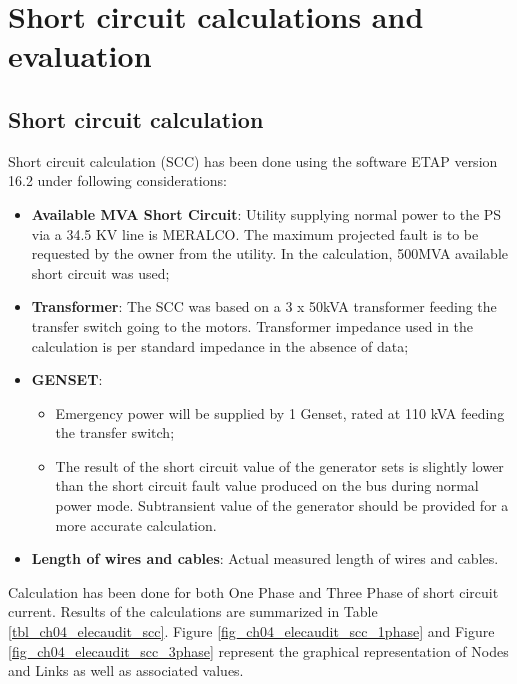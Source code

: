 %
\section{Short circuit calculations and evaluation} \label{ch04_elecaudit_shortcuircuitanalysis}
\subsection{Short circuit calculation}
Short circuit calculation (SCC) has been done using the software ETAP version 16.2 under following considerations:
\begin{itemize}
\item \textbf{Available MVA Short Circuit}: Utility supplying normal power to the PS  via a 34.5 KV line is MERALCO. The maximum projected fault is to be requested by the owner from the utility.  In the calculation, 500MVA available short circuit was used;

\item \textbf{Transformer}: The SCC was based on a  3 x 50kVA transformer  feeding the transfer switch going to the motors. Transformer impedance used in the calculation is per standard impedance in the absence of data;

\item \textbf{GENSET}: 
\begin{itemize}
\item Emergency power will be supplied by 1 Genset, rated at 110 kVA feeding the transfer switch;%

\item The result of the short circuit value of the generator sets is slightly lower than the short circuit fault value produced on the bus during normal power mode. Subtransient value of the generator should be provided for a more accurate calculation. 

\end{itemize}

\item \textbf{Length of wires and cables}: Actual measured length of wires and cables.

\end{itemize}

Calculation has been done for both One Phase and Three Phase of short circuit current. Results of the calculations are summarized in Table \ref{tbl_ch04_elecaudit_scc}. Figure \ref{fig_ch04_elecaudit_scc_1phase} and Figure \ref{fig_ch04_elecaudit_scc_3phase} represent the graphical representation of Nodes and Links as well as associated values.

